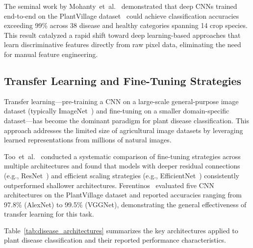 \documentclass[journal]{IEEEtran}
\begin{document}
The seminal work by Mohanty~et~al.~\cite{mohanty2016using} demonstrated that deep CNNs trained end-to-end on the PlantVillage dataset~\cite{hughes2015open} could achieve classification accuracies exceeding 99\% across 38 disease and healthy categories spanning 14 crop species. This result catalyzed a rapid shift toward deep learning-based approaches that learn discriminative features directly from raw pixel data, eliminating the need for manual feature engineering.

\subsection{Transfer Learning and Fine-Tuning Strategies}

Transfer learning---pre-training a CNN on a large-scale general-purpose image dataset (typically ImageNet~\cite{deng2009imagenet}) and fine-tuning on a smaller domain-specific dataset---has become the dominant paradigm for plant disease classification. This approach addresses the limited size of agricultural image datasets by leveraging learned representations from millions of natural images.

Too~et~al.~\cite{too2019comparative} conducted a systematic comparison of fine-tuning strategies across multiple architectures and found that models with deeper residual connections (e.g., ResNet~\cite{he2016deep}) and efficient scaling strategies (e.g., EfficientNet~\cite{tan2019efficientnet}) consistently outperformed shallower architectures. Ferentinos~\cite{ferentinos2018deep} evaluated five CNN architectures on the PlantVillage dataset and reported accuracies ranging from 97.8\% (AlexNet) to 99.5\% (VGGNet), demonstrating the general effectiveness of transfer learning for this task.

Table~\ref{tab:disease_architectures} summarizes the key architectures applied to plant disease classification and their reported performance characteristics.
\end{document}
